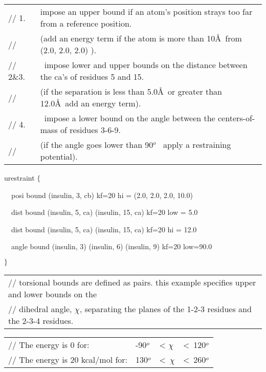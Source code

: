 \begin{tabular}{ll}
{\footnotesize // 1. } & {\footnotesize impose an upper bound if an atom's
position strays too far from a reference position.} \\ 
{\footnotesize // } & {\footnotesize (add an energy term if the atom is more
than 10\AA\ {}from (2.0, 2.0, 2.0) ).} \\ 
{\footnotesize // 2\&3.} & {\footnotesize \ impose lower and upper bounds on
the distance between the ca's of residues 5 and 15.} \\ 
{\footnotesize //} & {\footnotesize (if the separation is less than 5.0\AA\ 
{}or greater than 12.0\AA\ {}add an energy term).} \\ 
{\footnotesize // 4.} & {\footnotesize \ impose a lower bound on the angle
between the centers-of-mass of residues 3-6-9.} \\ 
{\footnotesize //} & {\footnotesize (if the angle goes lower than 90}$^{o}$
{\footnotesize \ apply a restraining potential).}
\end{tabular}

urestraint $\{$

~~posi bound (insulin, 3, cb) kf=20 hi = (2.0, 2.0, 2.0, 10.0)

~~dist bound (insulin, 5, ca) (insulin, 15, ca) kf=20 low = 5.0

~~dist bound (insulin, 5, ca) (insulin, 15, ca) kf=20 hi = 12.0

~~angle bound (insulin, 3) (insulin, 6) (insulin, 9) kf=20 low=90.0

$\}\bigskip $

\begin{tabular}{l}
{\footnotesize // torsional bounds are defined as pairs. this example
specifies upper and lower bounds on the} \\ 
{\footnotesize // dihedral angle, }$\chi ${\footnotesize {}, separating the
planes of the 1-2-3 residues and the 2-3-4 residues.}
\end{tabular}

\begin{tabular}{llll}
{\footnotesize // The energy is 0 for:} & {\footnotesize -90}$^{o}$ & 
{\footnotesize < }$\chi $ & {\footnotesize <\ 120}$
^{o}$ \\ 
{\footnotesize // The energy is 20 kcal/mol for:} & {\footnotesize 130}$^{o}$
& {\footnotesize <\ }$\chi $ & {\footnotesize <\
260}$^{o}$
\end{tabular}

